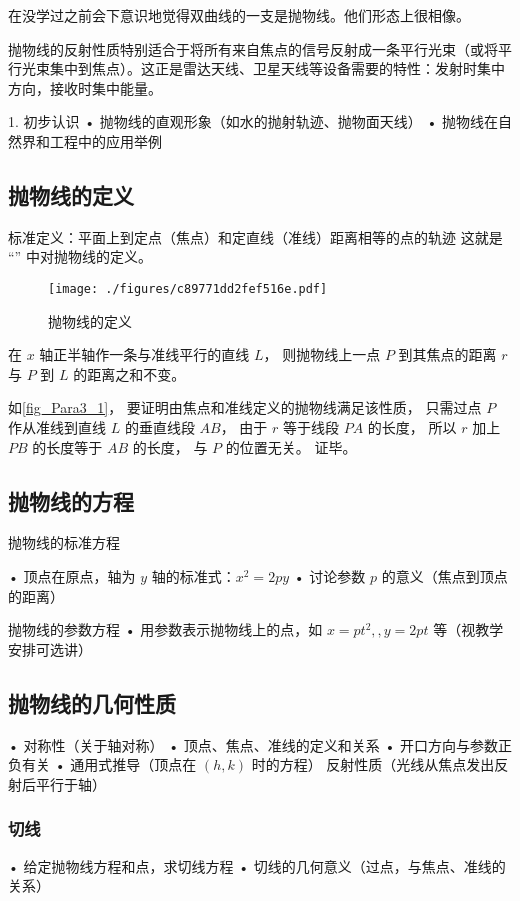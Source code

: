在没学过之前会下意识地觉得双曲线的一支是抛物线。他们形态上很相像。

抛物线的反射性质特别适合于将所有来自焦点的信号反射成一条平行光束（或将平行光束集中到焦点）。这正是雷达天线、卫星天线等设备需要的特性：发射时集中方向，接收时集中能量。

1. 初步认识
	•	抛物线的直观形象（如水的抛射轨迹、抛物面天线）
	•	抛物线在自然界和工程中的应用举例
\subsection{抛物线的定义}
标准定义：平面上到定点（焦点）和定直线（准线）距离相等的点的轨迹
这就是 “” 中对抛物线的定义。
\begin{figure}[ht]
\centering
\texttt{[image: ./figures/c89771dd2fef516e.pdf]}
\caption{抛物线的定义} \label{fig_Para3_1}
\end{figure}

在 $x$ 轴正半轴作一条与准线平行的直线 $L$， 则抛物线上一点 $P$ 到其焦点的距离 $r$ 与 $P$ 到 $L$ 的距离之和不变。

如\autoref{fig_Para3_1}， 要证明由焦点和准线定义的抛物线满足该性质， 只需过点 $P$ 作从准线到直线 $L$ 的垂直线段 $AB$， 由于 $r$ 等于线段 $PA$ 的长度， 所以 $r$ 加上 $PB$ 的长度等于 $AB$ 的长度， 与 $P$ 的位置无关。 证毕。


\subsection{抛物线的方程}
\begin{theorem}{抛物线的标准方程}

\end{theorem}
	•	顶点在原点，轴为 $y$ 轴的标准式：$x^2=2py$
	•	讨论参数 $p$ 的意义（焦点到顶点的距离）
\begin{theorem}{抛物线的参数方程}
	•	用参数表示抛物线上的点，如 $x=pt^2,,y=2pt$ 等（视教学安排可选讲）
\end{theorem}

\subsection{抛物线的几何性质}
	•	对称性（关于轴对称）
	•	顶点、焦点、准线的定义和关系
	•	开口方向与参数正负有关
	•	通用式推导（顶点在 $(h,k)$ 时的方程）
    反射性质（光线从焦点发出反射后平行于轴）
\subsubsection{切线}
	•	给定抛物线方程和点，求切线方程
	•	切线的几何意义（过点，与焦点、准线的关系）
